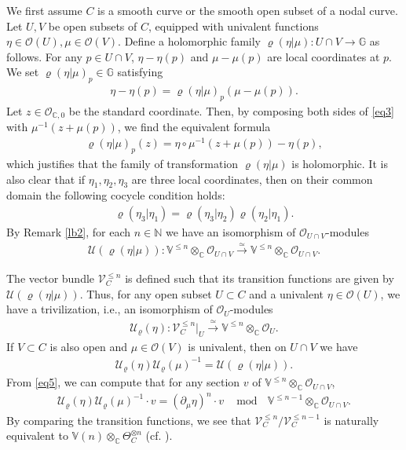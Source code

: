 \documentclass[12pt,a4paper,notitlepage]{article}
\theoremstyle{definition}
\theoremstyle{plain}
\newcommand{\mc}{\mathcal}
\newcommand{\scr}{\mathscr}
\newcommand{\Vbb}{\mathbb V}
\newcommand{\Gbb}{\mathbb G}
\newcommand{\Cbb}{\mathbb C}
\newcommand{\Nbb}{\mathbb N}
\numberwithin{equation}{section}
\begin{document}
We first assume $C$ is a smooth curve or the smooth open subset of a nodal curve. Let $U,V$ be open subsets of $C$, equipped with univalent functions $\eta\in\scr O(U),\mu\in\scr O(V)$.   Define a holomorphic family $\varrho(\eta|\mu):U\cap V\rightarrow\Gbb$  as follows. For any $p\in U\cap V$, $\eta-\eta(p)$ and $\mu-\mu(p)$ are local coordinates at $p$. We set $\varrho(\eta|\mu)_p\in\Gbb$ satisfying
\begin{align}
\eta-\eta(p)=\varrho(\eta|\mu)_p(\mu-\mu(p)).\label{eq3}
\end{align}
Let $z\in\scr O_{\Cbb,0}$ be the standard coordinate. Then, by composing both sides of \eqref{eq3} with $\mu^{-1}(z+\mu(p))$, we find the equivalent formula
\begin{align}
\varrho(\eta|\mu)_p(z)=\eta\circ\mu^{-1}(z+\mu(p))-\eta(p),
\end{align}
which justifies that the family of transformation $\varrho(\eta|\mu)$ is holomorphic. It is also clear that if $\eta_1,\eta_2,\eta_3$ are three local coordinates, then on their common domain the following cocycle condition holds:
\begin{align}
\varrho(\eta_3|\eta_1)=\varrho(\eta_3|\eta_2)\varrho(\eta_2|\eta_1).\label{eq19}
\end{align}
By Remark \ref{lb2}, for each $n\in\Nbb$ we have an isomorphism of $\scr O_{U\cap V}$-modules
\begin{align*}
\mc U(\varrho(\eta|\mu)):\Vbb^{\leq n}\otimes_\Cbb\scr O_{U\cap V}\xrightarrow{\simeq}\Vbb^{\leq n}\otimes_\Cbb\scr O_{U\cap V}.
\end{align*}

The vector bundle $\scr V_C^{\leq n}$ is defined such that its transition functions are given by $\mc U(\varrho(\eta|\mu))$. Thus, for any open subset $U\subset C$ and a univalent $\eta\in\scr O(U)$, we have a trivilization, i.e., an isomorphism of \index{U@$\mc U_\varrho(\eta)$} $\scr O_U$-modules 
\begin{align}\label{eq4}
\mc U_\varrho(\eta):\scr V_C^{\leq n}|_U\xrightarrow{\simeq} \Vbb^{\leq n}\otimes_{\Cbb}\scr O_U.
\end{align}
If $V\subset C$ is also open and  $\mu\in\scr O(V)$ is univalent, then  on $U\cap V$ we have
\begin{align}
\mc U_\varrho(\eta)\mc U_\varrho(\mu)^{-1}=\mc U(\varrho(\eta|\mu)).\label{eq30}
\end{align}
From \eqref{eq5}, we can compute that for any section $v$ of $\Vbb^{\leq n}\otimes_{\Cbb}\scr O_{U\cap V}$,
\begin{align}
\mc U_\varrho(\eta)\mc U_\varrho(\mu)^{-1}\cdot v=(\partial_\mu\eta)^n\cdot v~~\mod ~~\Vbb^{\leq n-1}\otimes_{\Cbb}\scr O_{U\cap V}.\label{eq8}
\end{align}
By comparing the transition functions, we see that $\scr V_C^{\leq n}/\scr V_C^{\leq n-1}$ is naturally equivalent to $\Vbb(n)\otimes_\Cbb\Theta_C^{\otimes n}$ (cf. \cite[Sec. 6.5.9]{FB04}).
\end{document}
